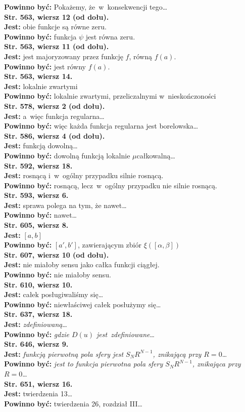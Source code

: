 \documentclass[a4paper]{article}
\newcommand{\tb}{\textbf}
\newcommand{\StrWg}[2]{\tb{Str. #1, wiersz #2.}}
\newcommand{\StrWd}[2]{\tb{Str. #1, wiersz #2 (od dołu).}}
\newcommand{\Jest}{\tb{Jest: }}
\newcommand{\Pow}{\tb{Powinno być: }}
\begin{document}
\Pow Pokażemy, że~w~konsekwencji tego\ldots \\
\StrWd{563}{12} \\
\Jest obie funkcje są równe zeru. \\
\Pow funkcja $\psi$ jest równa zeru. \\
\StrWd{563}{11} \\
\Jest jest majoryzowany przez funkcję $f$, równą $f( a )$. \\
\Pow jest równy $f( a )$.\\
\StrWg{563}{14} \\
\Jest lokalnie zwartymi \\
\Pow lokalnie zwartymi, przeliczalnymi w~nieskończoności \\
\StrWd{578}{2} \\
\Jest a~więc funkcja regularna\ldots \\
\Pow więc każda funkcja regularna jest borelowska\ldots \\
\StrWd{586}{4} \\
\Jest funkcją dowolną\ldots \\
\Pow dowolną funkcją lokalnie $\mu$\dywiz całkowalną\ldots \\
\StrWg{592}{18} \\
\Jest rosnącą i~w~ogólny przypadku silnie rosnącą. \\
\Pow rosnącą, lecz~w~ogólny przypadku nie silnie rosnącą. \\
\StrWg{593}{6} \\
\Jest sprawa polega na tym, że nawet\ldots \\
\Pow nawet\ldots \\
\StrWg{605}{8} \\
\Jest $[ a, b ]$ \\
\Pow $[ a', b' ]$, zawierającym zbiór $\xi( [ \alpha, \beta ] )$ \\
\StrWd{607}{10} \\
\Jest nie miałoby sensu jako całka funkcji ciągłej. \\
\Pow nie miałoby sensu. \\
\StrWg{610}{10} \\
\Jest całek posługiwaliśmy się\ldots \\
\Pow niewłaściwej całek posłużymy się\ldots \\
\StrWg{637}{18} \\
\Jest \emph{zdefiniowaną}\ldots \\
\Pow \emph{gdzie $D( u )$ jest~zdefiniowane}\ldots \\
\StrWg{646}{9} \\
\Jest \emph{funkcją pierwotną pola sfery jest $S_{ N } R^{ N - 1 }$,
  znikającą przy $R = 0$}\ldots \\
\Pow \emph{jest to funkcja pierwotna pola sfery $S_{ N } R^{ N - 1 }$,
  znikająca przy $R = 0$}\ldots \\
\StrWg{651}{16} \\
\Jest twierdzenia 13\ldots \\
\Pow twierdzenia 26, rozdział III\ldots \\
\end{document}

